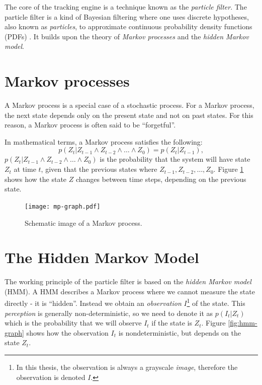 The core of the tracking engine is a technique known as the
\emph{particle filter}.  The particle filter is a kind of Bayesian
filtering where one uses discrete hypotheses, also known as
\emph{particles}, to approximate continuous probability density
functions (PDFs) \cite{ProbRob}.  It builds upon the theory of
\emph{Markov processes} and the \emph{hidden Markov model}.

\section{Markov processes} A Markov process is a special case of a
stochastic process. For a Markov process, the next state depends only
on the present state and not on past states.  For this reason, a
Markov process is often said to be ``forgetful''.

In mathematical terms, a Markov process satisfies the following:
\begin{equation} p\left(Z_t|Z_{t-1} \wedge Z_{t-2} \wedge \dots \wedge
Z_0\right) = p\left(Z_t|Z_{t-1}\right),
\end{equation} $p\left(Z_t|Z_{t-1} \wedge Z_{t-2} \wedge \dots \wedge
Z_0\right)$ is the probability that the system will have state $Z_t$
at time $t$, given that the previous states where $Z_{t-1},
Z_{t-2},\dots, Z_0$. Figure \ref{fig:mp-graph} shows how the state $Z$
changes between time steps, depending on the previous state.

\begin{figure}
  \centering
  \texttt{[image: mp-graph.pdf]}
  \caption{Schematic image of a Markov process.}
  \label{fig:mp-graph}
\end{figure}

\section{The Hidden Markov Model}

The working principle of the particle filter is based on the
\emph{hidden Markov model} (HMM).  A HMM describes a Markov process
where we cannot measure the state directly - it is
``hidden''\cite{EncyclopediaMachineLearning}.  Instead we obtain an
\emph{observation} $I$\footnote{In this thesis, the observation is
always a grayscale \emph{image}, therefore the observation is denoted
$I$.}  of the state. This \emph{perception} is generally
non-deterministic, so we need to denote it as $p(I_t|Z_t)$ which is
the probability that we will observe $I_t$ if the state is
$Z_t$. Figure \ref{fig:hmm-graph} shows how the observation $I_t$ is
nondeterministic, but depends on the state $Z_t$.

